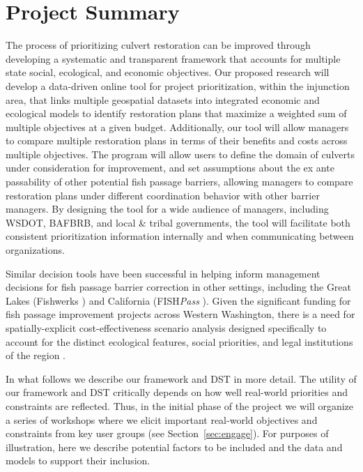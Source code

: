 \documentclass[12pt]{elsarticle}
\begin{document}
\section{Project Summary}\label{sec:summary} %

The process of prioritizing culvert restoration can be improved through developing a systematic and transparent framework that accounts for multiple state social, ecological, and economic objectives. Our proposed research will develop a data-driven online tool for project prioritization, within the injunction area, that links multiple geospatial datasets into integrated economic and ecological models to identify restoration plans that maximize a weighted sum of multiple objectives at a given budget. Additionally, our tool will allow managers to compare multiple restoration plans in terms of their benefits and costs across multiple objectives. The program will allow users to define the domain of culverts under consideration for improvement, and set assumptions about the ex ante passability of other potential fish passage barriers, allowing managers to compare restoration plans under different coordination behavior with other barrier managers. By designing the tool for a wide audience of managers, including WSDOT, BAFBRB, and local & tribal governments, the tool will facilitate both consistent prioritization information internally and when communicating between organizations. 

Similar decision tools have been successful in helping inform management decisions for fish passage barrier correction in other settings, including the Great Lakes (Fishwerks \citep{moody2017pet}) and California (FISH\emph{Pass} \citep{optipass2015migratory}). Given the significant funding for fish passage improvement projects across Western Washington, there is a need for spatially-explicit cost-effectiveness scenario analysis designed specifically to account for the distinct ecological features, social priorities, and legal institutions of the region \citep{mckay2020dst}. 

In what follows we describe our framework and DST in more detail. The utility of our framework and DST critically depends on how well real-world priorities and constraints are reflected. Thus, in the initial phase of the project we will organize a series of workshops where we elicit important real-world objectives and constraints from key user groups (see Section~\ref{sec:engage}). For purposes of illustration, here we describe potential factors to be included and the data and models to support their inclusion.   
\end{document}
